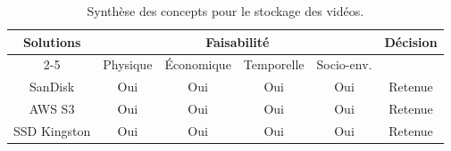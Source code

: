 \renewcommand{\arraystretch}{1.3}

\begin{table}[H]
  \centering
  \begin{tabular}{|c|c|c|c|c|c|}
    \hline
    \multirow{2}{*}{\textbf{Solutions}}
    & \multicolumn{4}{c|}{\textbf{Faisabilité}}
    & \multirow{2}{*}{\textbf{Décision}}
    \\ \cline{2-5}
    & Physique                                  & Économique & Temporelle & Socio-env. &         \\ \hline
    SanDisk      & Oui                                       & Oui        & Oui        & Oui        & Retenue \\ \hline
    AWS S3       & Oui                                       & Oui        & Oui        & Oui        & Retenue \\ \hline
    SSD Kingston & Oui                                       & Oui        & Oui        & Oui        & Retenue \\ \hline
  \end{tabular}
  \caption{Synthèse des concepts pour le stockage des vidéos.}
  \label{tab:tableau-synthese-fonction-7}
\end{table}
